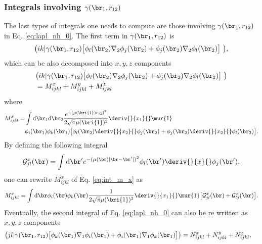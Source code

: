 \subsubsection{Integrals involving ${\bf {\gamma}}(\br_1, r_{12})$}
The last types of integrals one needs to compute are those involving ${\bf {\gamma}}(\br_1, r_{12})$ in Eq. \eqref{eq:lapl_nh_0}. 
The first term in ${\bf {\gamma}}(\br_1, r_{12})$ is
\begin{equation}
 \begin{aligned}
 \big(ik|{\bf {\gamma}}(\br_1, r_{12}) \big[ \phi_l(\br_2)\nabla_2 \phi_j(\br_2) + \phi_j(\br_2)\nabla_2 \phi_l(\br_2) \big] \big),
 \end{aligned}
\end{equation}
which can be also decomposed into $x,y,z$ components 
\begin{equation}
 \begin{aligned}
 & \big(ik|{\bf {\gamma}}(\br_1, r_{12}) \big[ \phi_l(\br_2)\nabla_2 \phi_j(\br_2) + \phi_j(\br_2)\nabla_2 \phi_l(\br_2) \big] \big) \\
 & = M_{ijkl}^x  + M_{ijkl}^y  + M_{ijkl}^z 
 \end{aligned}
\end{equation}
where 
\begin{equation}
 \label{eq:int_m_x}
 \begin{aligned}
  M_{ijkl}^x =  & \int \text{d}\br_1 \text{d}\br_2 \frac{e^{-(\mu(\bri{1}) r_{12})^2}}{2 \sqrt{\pi} \mu(\bri{1})^2} \deriv{}{x_1}{} \mur{1} \\
                & \phi_i(\br_1) \phi_k(\br_1) \big[ \phi_l(\br_2)\deriv{}{x_2}{}\phi_j(\br_2) + \phi_j(\br_2)\deriv{}{x_2}{} \phi_l(\br_2)  \big].
 \end{aligned}
\end{equation}
By defining the following integral 
\begin{equation}
 \mathcal{G}^x_{jl}(\br) = \int \text{d}\br' e^{-(\mu(\br) |\br - \br'|)^2} 
                \phi_l(\br')\deriv{}{x}{}\phi_j(\br'), 
\end{equation}
one can rewrite $M_{ijkl}^x $ of Eq. \eqref{eq:int_m_x} as 
\begin{equation}
 M_{ijkl}^x = \int \text{d}\br \phi_i(\br) \phi_k(\br) \frac{1}{2 \sqrt{\pi} \mu(\bri{1})^2}\deriv{}{x_1}{} \mur{1} \big[\mathcal{G}^x_{jl}(\br) + \mathcal{G}^x_{lj}(\br) \big]. 
\end{equation}
Eventually, the second integral of Eq. \eqref{eq:lapl_nh_0} can also be re written as $x,y,z$ components 
\begin{equation}
 \begin{aligned}
 \big(jl|{\bf {\gamma}}(\br_1, r_{12}) \big[ \phi_k(\br_1) \nabla_1 \phi_i(\br_1) + \phi_i(\br_1) \nabla_1 \phi_k(\br_1) \big] \big) 
 & = N_{ijkl}^x + N_{ijkl}^y + N_{ijkl}^z, 
 \end{aligned}
\end{equation}
